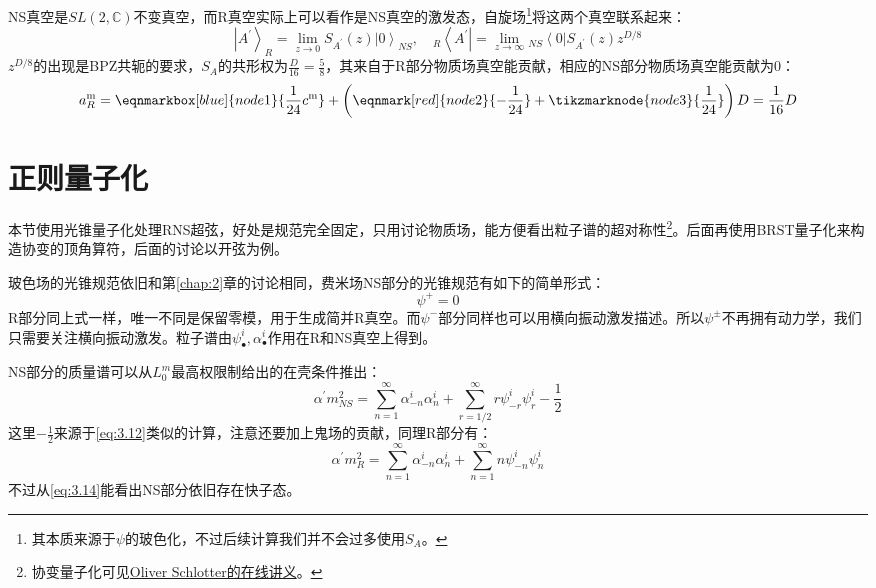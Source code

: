 NS真空是$SL(2,\mathbb{C})$不变真空，而R真空实际上可以看作是NS真空的激发态，自旋场\footnote{其本质来源于$\psi$的玻色化\cite{Blumenhagen:2013fgp,Schlotterer:2012zz}，不过后续计算我们并不会过多使用$S_A$。}将这两个真空联系起来：
\begin{equation}
	\left|A^{\prime}\right\rangle_{R}=\lim_{z\to 0}S_{{A^{\prime}}}(z)\left|0\right\rangle_{NS},\quad 
	{}_R\left\langle A^{\prime}\right|=\lim_{z\to\infty}{}_{NS}\left\langle0\right|S_{{A^{\prime}}}(z)z^{D/8}
\end{equation}
$z^{D/8}$的出现是BPZ共轭的要求\cite{itocft}，$S_A$的共形权为$\frac{D}{16}=\frac58$，其来自于R部分物质场真空能贡献，相应的NS部分物质场真空能贡献为0：
\vspace{1.5em}%
\begin{equation}
	\label{eq:3.12}
	a^{\mathrm{m}}_R=
	\eqnmarkbox[blue]{node1}{\frac{1}{24}c^{\mathrm{m}}}+
	\left(\eqnmark[red]{node2}{-\frac{1}{24}}+\tikzmarknode{node3}{\frac{1}{24}}\right)D=\frac{1}{16}D
\end{equation}
\vspace{1em}
\section{正则量子化}
本节使用光锥量子化处理RNS超弦，好处是规范完全固定，只用讨论物质场，能方便看出粒子谱的超对称性\footnote{协变量子化可见\href{https://www.uu.se/en/department/physics-and-astronomy/research/theoretical-physics/oliver-schlotterer}{Oliver Schlotter的在线讲义}。}。后面再使用BRST量子化来构造协变的顶角算符，后面的讨论以开弦为例。

玻色场的光锥规范依旧和第\ref{chap:2}章的讨论相同，费米场NS部分的光锥规范有如下的简单形式：
\begin{equation}
	\psi^+ = 0
\end{equation}
R部分同上式一样，唯一不同是保留零模，用于生成简并R真空。而$\psi^-$部分同样也可以用横向振动激发描述。所以$\psi^\pm$不再拥有动力学，我们只需要关注横向振动激发。粒子谱由$\psi^i_\bullet,\alpha^i_\bullet$作用在R和NS真空上得到。

NS部分的质量谱可以从$L_0^m$最高权限制给出的在壳条件推出：
\begin{equation}
	\label{eq:3.14}
	\alpha^{\prime}m^2_{NS}=\sum_{n=1}^\infty\alpha_{-n}^i\alpha_n^i+\sum_{r=1/2}^\infty r\psi_{-r}^i\psi_r^i-\frac{1}{2}
\end{equation}
这里$-\frac12$来源于\ref{eq:3.12}类似的计算，注意还要加上鬼场的贡献，同理R部分有：
\begin{equation}
	\alpha^{\prime}m^2_{R}=\sum_{n=1}^\infty\alpha_{-n}^i\alpha_n^i+\sum_{n=1}^\infty n\psi_{-n}^i \psi_n^i
\end{equation}
不过从\ref{eq:3.14}能看出NS部分依旧存在快子态。

